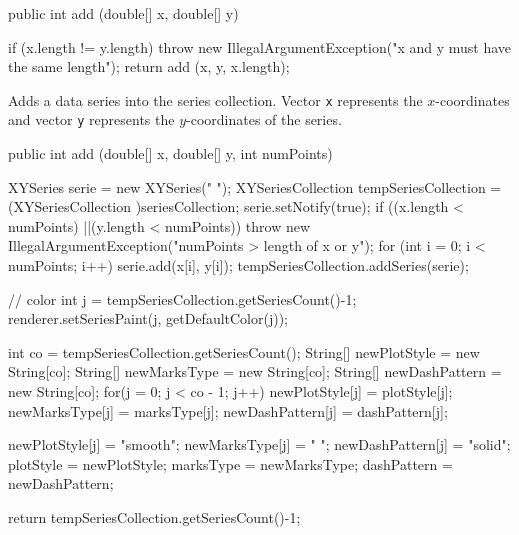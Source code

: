 \begin{code}

   public int add (double[] x, double[] y) \begin{hide} {
      if (x.length != y.length)
         throw new IllegalArgumentException("x and y must have the same length");
      return add (x, y, x.length);
   }\end{hide}
\end{code}
\begin{tabb}
   Adds a data series into the series collection. Vector \texttt{x} represents
   the $x$-coordinates and vector \texttt{y} represents the $y$-coordinates of
   the series.
\end{tabb}
\begin{htmlonly}
\end{htmlonly}
\begin{code}

   public int add (double[] x, double[] y, int numPoints) \begin{hide} {
      XYSeries serie = new XYSeries(" ");
      XYSeriesCollection tempSeriesCollection = (XYSeriesCollection )seriesCollection;
      serie.setNotify(true);
      if ((x.length < numPoints) ||(y.length < numPoints))
         throw new IllegalArgumentException("numPoints > length of x or y");
      for (int i = 0; i < numPoints; i++)
         serie.add(x[i], y[i]);
      tempSeriesCollection.addSeries(serie);

      // color
      int j = tempSeriesCollection.getSeriesCount()-1;
      renderer.setSeriesPaint(j, getDefaultColor(j));

      int co = tempSeriesCollection.getSeriesCount();
      String[] newPlotStyle = new String[co];
      String[] newMarksType = new String[co];
      String[] newDashPattern = new String[co];
      for(j = 0; j < co - 1; j++) {
         newPlotStyle[j] = plotStyle[j];
         newMarksType[j] = marksType[j];
         newDashPattern[j] = dashPattern[j];
      }

      newPlotStyle[j] = "smooth";
      newMarksType[j] = " ";
      newDashPattern[j] = "solid";
      plotStyle = newPlotStyle;
      marksType = newMarksType;
      dashPattern = newDashPattern;

      return tempSeriesCollection.getSeriesCount()-1;
   }\end{hide}
\end{code}
